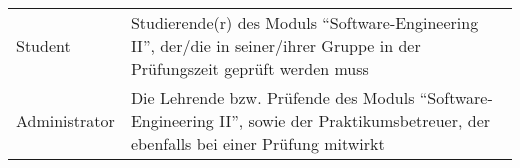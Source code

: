 \documentclass[]{article}
\begin{document}
\begin{longtable}[]{@{}ll@{}}
\begin{minipage}[t]{0.42\columnwidth}
Student\strut
\end{minipage} & \begin{minipage}[t]{0.52\columnwidth}\raggedright
Studierende(r) des Moduls ``Software-Engineering II'', der/die in
seiner/ihrer Gruppe in der Prüfungszeit geprüft werden muss\strut
\end{minipage}\tabularnewline
\begin{minipage}[t]{0.42\columnwidth}\raggedright
Administrator\strut
\end{minipage} & \begin{minipage}[t]{0.52\columnwidth}\raggedright
Die Lehrende bzw. Prüfende des Moduls ``Software-Engineering II'', sowie
der Praktikumsbetreuer, der ebenfalls bei einer Prüfung mitwirkt\strut
\end{minipage}\tabularnewline
\bottomrule
\end{longtable}
\end{document}
